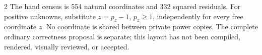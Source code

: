 \documentclass[10pt,letterpaper]{article}
\begin{document}
\begin{multicols}{2}
The hand census is 554 natural coordinates and 332 squared residuals.
For positive unknowns, substitute $z=p_z-1$, $p_z\ge1$, independently
for every free coordinate $z$. No coordinate is shared between private
power copies. The complete ordinary correctness proposal is separate;
this layout has not been compiled, rendered, visually reviewed, or accepted.
\end{multicols}
\end{document}
